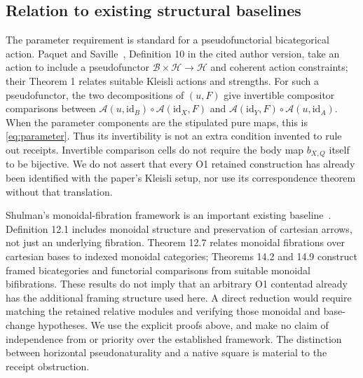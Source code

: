 \documentclass[11pt,a4paper]{article}
\theoremstyle{definition}
\newcommand{\id}{\mathrm{id}}
\begin{document}
\subsection{Relation to existing structural baselines}
The parameter requirement is standard for a pseudofunctorial bicategorical
action. Paquet and Saville~\cite{PaquetSaville}, Definition 10 in the cited
author version, take an action to include a pseudofunctor
$\mathcal B\times\mathcal H\to\mathcal H$ and coherent action constraints;
their Theorem 1 relates suitable Kleisli actions and strengths.
For such a pseudofunctor, the two decompositions of $(u,F)$ give invertible
compositor comparisons between
$\mathcal A(u,\id_B)\circ\mathcal A(\id_X,F)$ and
$\mathcal A(\id_Y,F)\circ\mathcal A(u,\id_A)$.
When the parameter components are the stipulated pure maps, this is
\eqref{eq:parameter}. Thus its invertibility is not an extra condition
invented to rule out receipts. Invertible comparison cells do not require
the body map $b_{X,Q}$ itself to be bijective. We do not assert that every
O1 retained construction has already been identified with the paper's
Kleisli setup, nor use its correspondence theorem without that translation.

Shulman's monoidal-fibration framework is an important existing
baseline~\cite{Shulman}. Definition 12.1 includes monoidal structure and
preservation of cartesian arrows, not just an underlying fibration.
Theorem 12.7 relates monoidal fibrations over cartesian bases to indexed
monoidal categories; Theorems 14.2 and 14.9 construct framed bicategories
and functorial comparisons from suitable monoidal bifibrations. These
results do not imply that an arbitrary O1 contentad already has the
additional framing structure used here. A direct reduction would require
matching the retained relative modules and verifying those monoidal and
base-change hypotheses. We use the explicit proofs above, and make no
claim of independence from or priority over the established framework.
The distinction between horizontal pseudonaturality and a native square
is material to the receipt obstruction.
\end{document}
